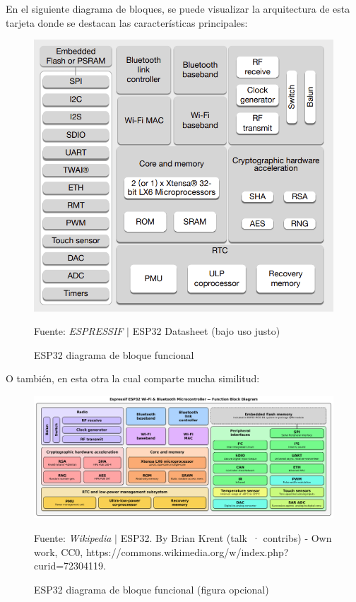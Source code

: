 \documentclass[conference]{IEEEtran}
\begin{document}
    \bigbreak

    En el siguiente diagrama de bloques, se puede visualizar la arquitectura de esta tarjeta donde se destacan las características principales:

    \begin{figure}[H]
        \centering
        \includegraphics[width=0.3\paperwidth]{images/esp32-functional-block-diagram}
        \caption{ESP32 diagrama de bloque funcional} \footnotesize
        Fuente: \textit{ESPRESSIF} $\mid$ ESP32 Datasheet \cite{espressif-systems-shanghai-co-ltd-2022B} (bajo uso justo)
    \end{figure}

    O también, en esta otra la cual comparte mucha similitud:

    \begin{figure}[H]
        \centering
        \includegraphics[width=0.3\paperwidth]{images/espressif-esp32-chip-function-block-diagram}
        \caption{ESP32 diagrama de bloque funcional (figura opcional)} \footnotesize
        Fuente: \textit{Wikipedia} $\mid$ ESP32. By Brian Krent (talk · contribs) - Own work, CC0, https://commons.wikimedia.org/w/index.php?curid=72304119.
\end{figure}
\end{document}
